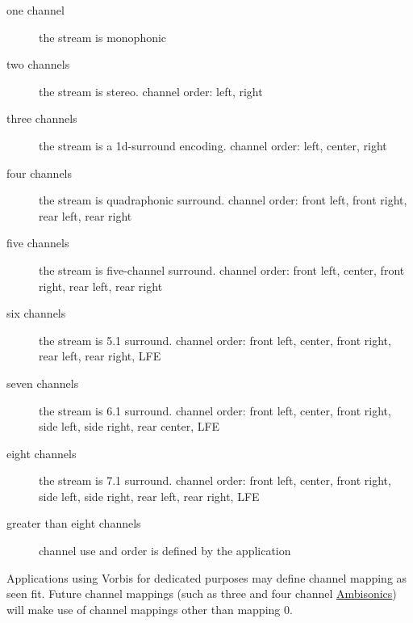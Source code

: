 \begin{description} %
 \item[one channel]
	the stream is monophonic

\item[two channels]
	the stream is stereo.  channel order: left, right

\item[three channels]
	the stream is a 1d-surround encoding.  channel order: left,
center, right

\item[four channels]
	the stream is quadraphonic surround.  channel order: front left,
front right, rear left, rear right

\item[five channels]
	the stream is five-channel surround.  channel order: front left,
center, front right, rear left, rear right

\item[six channels]
	the stream is 5.1 surround.  channel order: front left, center,
front right, rear left, rear right, LFE

\item[seven channels]
        the stream is 6.1 surround.  channel order: front left, center,
front right, side left, side right, rear center, LFE

\item[eight channels]
        the stream is 7.1 surround.  channel order: front left, center,
front right, side left, side right, rear left, rear right,
LFE

\item[greater than eight channels]
	channel use and order is defined by the application

\end{description}

Applications using Vorbis for dedicated purposes may define channel
mapping as seen fit.  Future channel mappings (such as three and four
channel \href{http://www.ambisonic.net/}{Ambisonics}) will
make use of channel mappings other than mapping 0.
